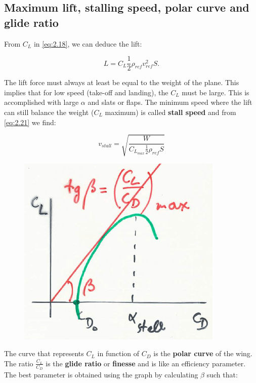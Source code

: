 		\subsection{Maximum lift, stalling speed, polar curve and glide ratio}
			From $C_L$ in \eqref{eq:2.18}, we can deduce the lift:
			
			\begin{equation}
			L = C_L \frac{1}{2} \rho _{ref} v^2_{ref} S.
			\label{eq:2.21}
			\end{equation}
			
			The lift force must always at least be equal to the weight of the plane. This implies that for low speed (take-off and landing), the $C_L$ must be large. This is accomplished with large $\alpha$ and slats or flaps. The minimum speed where the lift can still balance the weight ($C_L$ maximum) is called \textbf{stall speed} and from \eqref{eq:2.21} we find:
			
			\begin{equation}
			v_{stall} = \sqrt{\frac{W}{C_{L_{max}} \frac{1}{2} \rho_{ref} S}}
			\end{equation}
			
			\begin{figure}
			\vspace{-5mm}
			\includegraphics[scale=0.3]{ch2/21}
			\end{figure}
			The curve that represents $C_L$ in function of $C_D$ is the \textbf{polar curve} of the wing. The ratio $\frac{C_L}{C_D}$ is the \textbf{glide ratio} or \textbf{finesse} and is like an efficiency parameter. The best parameter is obtained using the graph by calculating $\beta$ such that: 
			
